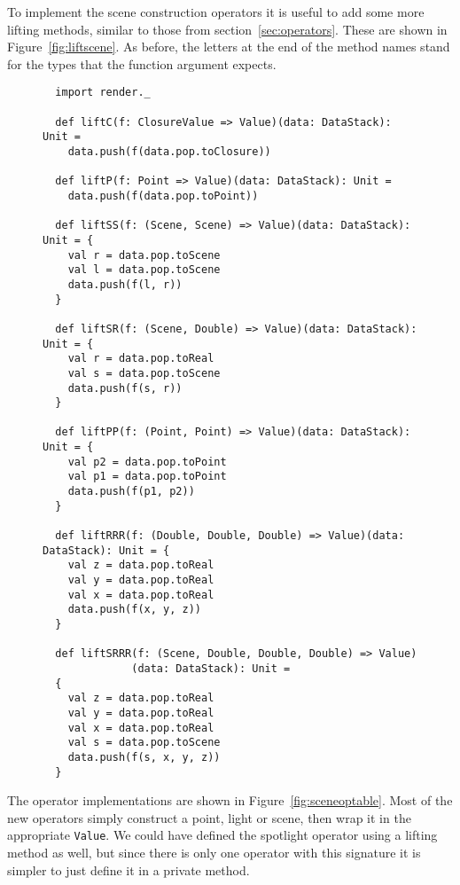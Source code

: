 To implement the scene construction operators
it is useful to add some more lifting methods,
similar to those from section~\ref{sec:operators}.
These are shown in Figure~\ref{fig:liftscene}.
As before,
the letters at the end of the method names
stand for the types that the function argument expects.

\begin{figure}
\begin{verbatim}
  import render._

  def liftC(f: ClosureValue => Value)(data: DataStack): Unit =
    data.push(f(data.pop.toClosure))

  def liftP(f: Point => Value)(data: DataStack): Unit =
    data.push(f(data.pop.toPoint))

  def liftSS(f: (Scene, Scene) => Value)(data: DataStack): Unit = {
    val r = data.pop.toScene
    val l = data.pop.toScene
    data.push(f(l, r))
  }

  def liftSR(f: (Scene, Double) => Value)(data: DataStack): Unit = {
    val r = data.pop.toReal
    val s = data.pop.toScene
    data.push(f(s, r))
  }

  def liftPP(f: (Point, Point) => Value)(data: DataStack): Unit = {
    val p2 = data.pop.toPoint
    val p1 = data.pop.toPoint
    data.push(f(p1, p2))
  }

  def liftRRR(f: (Double, Double, Double) => Value)(data: DataStack): Unit = {
    val z = data.pop.toReal
    val y = data.pop.toReal
    val x = data.pop.toReal
    data.push(f(x, y, z))
  }

  def liftSRRR(f: (Scene, Double, Double, Double) => Value)
              (data: DataStack): Unit =
  {
    val z = data.pop.toReal
    val y = data.pop.toReal
    val x = data.pop.toReal
    val s = data.pop.toScene
    data.push(f(s, x, y, z))
  }
\end{verbatim}
\getcaption
\end{figure}

The operator implementations are shown in Figure~\ref{fig:sceneoptable}.
Most of the new operators simply construct a point, light or scene,
then wrap it in the appropriate \verb!Value!.
We could have defined the spotlight operator using a lifting method as well,
but since there is only one operator with this signature
it is simpler to just define it in a private method.

